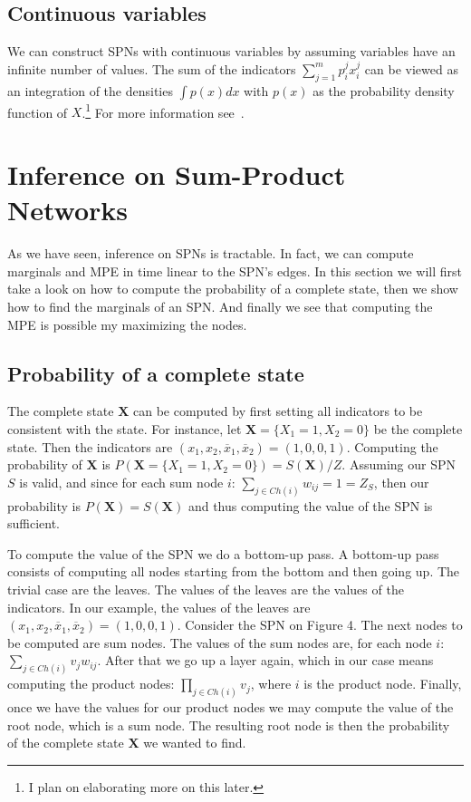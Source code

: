 \documentclass[a4paper,10pt]{article}
\theoremstyle{plain}
\begin{document}
\subsection{Continuous variables}

We can construct SPNs with continuous variables by assuming variables have an infinite number of
values. The sum of the indicators $\sum_{j=1}^m p_i^j x_i^j$ can be viewed as an integration of the
densities $\int p(x)dx$ with $p(x)$ as the probability density function of $X$.\footnote{I plan on
elaborating more on this later.} For more information see~\cite{poon-domingos}.

\section{Inference on Sum-Product Networks}

As we have seen, inference on SPNs is tractable. In fact, we can compute marginals and MPE in time
linear to the SPN's edges. In this section we will first take a look on how to compute the
probability of a complete state, then we show how to find the marginals of an SPN\@. And finally
we see that computing the MPE is possible my maximizing the nodes.

\subsection{Probability of a complete state}

The complete state $\mathbf{X}$ can be computed by first setting all indicators to be consistent
with the state. For instance, let $\mathbf{X}=\{X_1=1,X_2=0\}$ be the complete state. Then the
indicators are $(x_1,x_2,\overline{x}_1,\overline{x}_2)=(1, 0, 0, 1)$. Computing the probability
of $\mathbf{X}$ is $P(\mathbf{X}=\{X_1=1,X_2=0\})=S(\mathbf{X})/Z$. Assuming our SPN $S$ is valid,
and since for each sum node $i$: $\sum_{j\in Ch(i)} w_{ij}=1=Z_S$, then our probability is
$P(\mathbf{X})=S(\mathbf{X})$ and thus computing the value of the SPN is sufficient.

To compute the value of the SPN we do a bottom-up pass. A bottom-up pass consists of computing all
nodes starting from the bottom and then going up. The trivial case are the leaves. The values of
the leaves are the values of the indicators. In our example, the values of the leaves are
$(x_1,x_2,\overline{x}_1,\overline{x}_2)=(1,0,0,1)$. Consider the SPN on Figure 4. The next nodes
to be computed are sum nodes. The values of the sum nodes are, for each node $i$: $\sum_{j\in
Ch(i)}v_j w_{ij}$. After that we go up a layer again, which in our case means computing the product
nodes: $\prod_{j\in Ch(i)}v_j$, where $i$ is the product node. Finally, once we have the values for
our product nodes we may compute the value of the root node, which is a sum node. The resulting
root node is then the probability of the complete state $\mathbf{X}$ we wanted to find.
\end{document}
